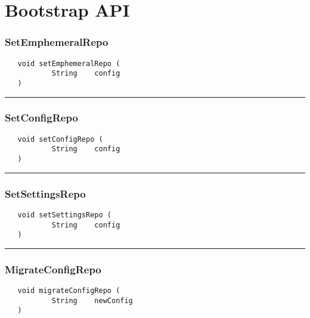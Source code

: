 \chapter{Bootstrap API}

\subsection{SetEmphemeralRepo}
\label{Api:SetEmphemeralRepo}
\begin{verbatim}
   void setEmphemeralRepo (
           String    config
   )
\end{verbatim}



\rule{15cm}{2pt}
\subsection{SetConfigRepo}
\label{Api:SetConfigRepo}
\begin{verbatim}
   void setConfigRepo (
           String    config
   )
\end{verbatim}



\rule{15cm}{2pt}
\subsection{SetSettingsRepo}
\label{Api:SetSettingsRepo}
\begin{verbatim}
   void setSettingsRepo (
           String    config
   )
\end{verbatim}



\rule{15cm}{2pt}
\subsection{MigrateConfigRepo}
\label{Api:MigrateConfigRepo}
\begin{verbatim}
   void migrateConfigRepo (
           String    newConfig
   )
\end{verbatim}



